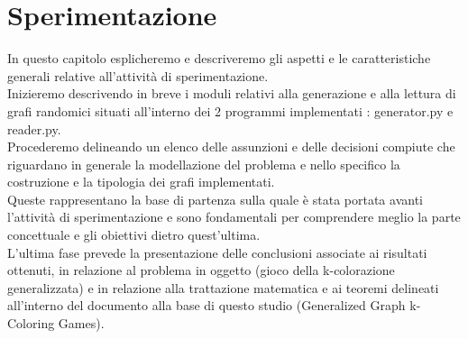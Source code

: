 \chapter{Sperimentazione}
\justify
In questo capitolo esplicheremo e descriveremo gli aspetti e le caratteristiche generali relative all'attività di sperimentazione.\\

Inizieremo descrivendo in breve i moduli relativi alla generazione e alla lettura di grafi randomici situati all'interno dei 2 programmi implementati : generator.py e reader.py.\\

Procederemo delineando un elenco delle assunzioni e delle decisioni compiute che riguardano in generale la modellazione del problema e nello specifico la costruzione e la tipologia dei grafi implementati.\\
Queste rappresentano la base di partenza sulla quale è stata portata avanti l'attività di sperimentazione e sono fondamentali per comprendere meglio la parte concettuale e gli obiettivi dietro quest'ultima.\\

L'ultima fase prevede la presentazione delle conclusioni associate ai risultati ottenuti, in relazione al problema in oggetto (gioco della k-colorazione generalizzata) e in relazione alla trattazione matematica e ai teoremi delineati all'interno del documento alla base di questo studio (Generalized Graph k-Coloring Games).\\

